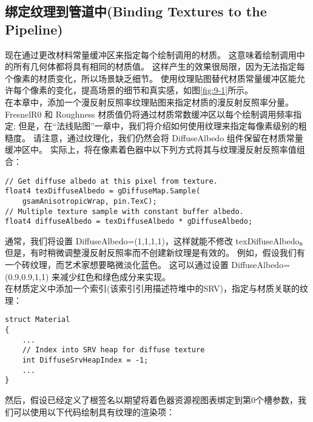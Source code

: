 \subsection{绑定纹理到管道中(Binding Textures to the Pipeline)}
\begin{flushleft}
现在通过更改材料常量缓冲区来指定每个绘制调用的材质。 这意味着绘制调用中的所有几何体都将具有相同的材质值。 这样产生的效果很局限，因为无法指定每个像素的材质变化，所以场景缺乏细节。 使用纹理贴图替代材质常量缓冲区能允许每个像素的变化，提高场景的细节和真实感，如图\ref{fig:9-1}所示。\\

在本章中，添加一个漫反射反照率纹理贴图来指定材质的漫反射反照率分量。 FresnelR0 和 Roughness 材质值仍将通过材质常数缓冲区以每个绘制调用频率指定; 但是，在“法线贴图”一章中，我们将介绍如何使用纹理来指定每像素级别的粗糙度。 请注意，通过纹理化，我们仍然会将 DiffuseAlbedo 组件保留在材质常量缓冲区中。 实际上，将在像素着色器中以下列方式将其与纹理漫反射反照率值组合：\\
\end{flushleft}

\begin{lstlisting}
// Get diffuse albedo at this pixel from texture.
float4 texDiffuseAlbedo = gDiffuseMap.Sample(
    gsamAnisotropicWrap, pin.TexC);
// Multiple texture sample with constant buffer albedo.
float4 diffuseAlbedo = texDiffuseAlbedo * gDiffuseAlbedo;
\end{lstlisting}

\begin{flushleft}
通常，我们将设置 DiffuseAlbedo=(1,1,1,1)，这样就能不修改 texDiffuseAlbedo。 但是，有时稍微调整漫反射反照率而不创建新纹理是有效的。 例如，假设我们有一个砖纹理，而艺术家想要略微淡化蓝色。 这可以通过设置 DiffuseAlbedo=(0.9,0.9,1,1) 来减少红色和绿色成分来实现。\\

在材质定义中添加一个索引(该索引引用描述符堆中的SRV)，指定与材质关联的纹理：\\
\end{flushleft}

\begin{lstlisting}
struct Material
{
    ...
    // Index into SRV heap for diffuse texture
    int DiffuseSrvHeapIndex = -1;
    ...
}
\end{lstlisting}

\begin{flushleft}
然后，假设已经定义了根签名以期望将着色器资源视图表绑定到第0个槽参数，我们可以使用以下代码绘制具有纹理的渲染项：\\
\end{flushleft}

